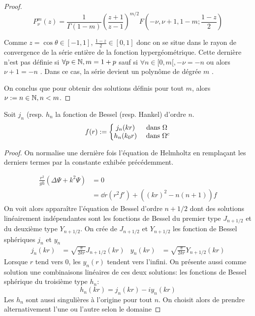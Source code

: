 \begin{proof}
{\[
P^m_\nu(z) = \frac{1}{\Gamma\left(1-m\right)}\left(\frac{z+1}{z-1}\right)^{m/2}F\left(-\nu,\nu+1,1-m;\frac{1-z}{2}\right)
\]

Comme $z=\cos\theta \in [-1,1] $, $\frac{1-z}{2} \in [0,1]$ donc on se situe dans le rayon de convergence de la série entière de la fonction hypergéométrique. Cette dernière n'est pas définie si $\forall p\in \mathbb N, m=1+p $ sauf si $\forall n \in [0,m[, -\nu = -n $ ou alors $ \nu +1 = -n $ \cite[p.~556]{abramowitz_handbook_1964}. Dans ce cas, la série devient un polynôme de dégrée $m$ \cite[p.~561]{abramowitz_handbook_1964}.

On conclus que pour obtenir des solutions définis pour tout $m$, alors $\nu:=n \in \mathbb N, n< m $.
}


\end{proof}


\begin{prop} Soit $j_n$ (resp. $h_n$ la fonction de Bessel (resp. Hankel) d'ordre $n$.
  \begin{equation}
    f(r) := \left\lbrace
    \begin{matrix}
    j_n(kr) & \text{ dans $\Omega$ } \\
    h_n(k_0r) & \text{ dans } \Omega^c \\
    \end{matrix}\right.
  \end{equation}
\end{prop}
\begin{proof}
On normalise une dernière fois l'équation de Helmholtz en remplaçant les derniers termes par la constante exhibée précédemment.

\begin{align*}
\frac{r^2}{gh} \left(\Delta \Psi + k^2 \Psi\right) &= 0 \\
&= \dd{r}{\left(r^2f'\right)} + \left((kr)^2 - n(n+1)\right)f
\end{align*}
  On voit alors apparaître l'équation de Bessel d'ordre $n +1/2$ dont des solutions linéairement indépendantes sont les fonctions de Bessel du premier type $J_{n+1/2}$ et du deuxième type $Y_{n+1/2}$\cite[p.~86]{bohren_absorption_2004}\cite[p.~1465]{morse_methods_1953}. 
  On crée de $J_{n+1/2}$ et $Y_{n+1/2}$ les fonction de Bessel sphériques $j_n$ et $y_n$ 
  \begin{align*}
  j_n(kr) &= \sqrt{\frac{\pi}{2kr}}J_{n+1/2}(kr) &
  y_n(kr) &= \sqrt{\frac{\pi}{2kr}}Y_{n+1/2}(kr)
  \end{align*}
  Lorsque $r$ tend vers $0$, les $y_n(r)$ tendent vers l'infini. On présente aussi comme solution une combinaisons linéaires de ces deux solutions: les fonctions de Bessel sphérique du troisième type $h_n$:
  \[
  h_n(kr)=j_n(kr)-i y_n(kr)
  \]
  Les $h_n$ sont aussi singulières à l'origine pour tout $n$. On choisit alors de prendre alternativement l'une ou l'autre selon le domaine
  \end{proof}



